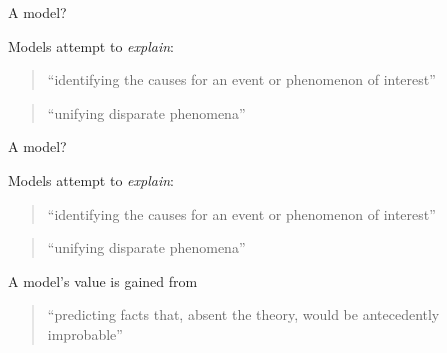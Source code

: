 \documentclass[compress]{beamer}
\begin{document}

{
\begin{frame}{A model?}

    Models attempt to \emph{explain}: 
    \begin{quote}
        ``identifying the causes for an event or phenomenon of interest''
    \end{quote}
    \begin{quote}
        ``unifying disparate phenomena''
    \end{quote}

\end{frame}
}









{
\begin{frame}{A model?}

    Models attempt to \emph{explain}: 
    \begin{quote}
        ``identifying the causes for an event or phenomenon of interest''
    \end{quote}
    \begin{quote}
        ``unifying disparate phenomena''
    \end{quote}

        A model's value is gained from
    \begin{quote}
        ``predicting facts that, absent the theory, would be antecedently
        improbable''
    \end{quote}


\end{frame}
}
\end{document}
